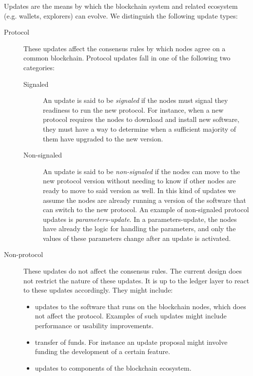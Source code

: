 \documentclass[11pt,a4paper]{article}
\begin{document}
Updates are the means by which the blockchain system and related ecosystem (e.g.
wallets, explorers) can evolve. We distinguish the following update types:
\begin{description}
\item[Protocol] These updates affect the consensus rules by which nodes agree on
  a common blockchain. Protocol updates fall in one of the following two
  categories:
  \begin{description}
  \item[Signaled] An update is said to be \emph{signaled} if the nodes must
    signal they readiness to run the new protocol. For instance, when a new
    protocol requires the nodes to download and install new software, they must
    have a way to determine when a sufficient majority of them have upgraded to
    the new version.
  \item[Non-signaled] An update is said to be \emph{non-signaled} if the nodes
    can move to the new protocol version without needing to know if other nodes
    are ready to move to said version as well. In this kind of updates we assume
    the nodes are already running a version of the software that can switch to
    the new protocol. An example of non-signaled protocol updates is
    \emph{parameters-update}. In a parameters-update, the nodes have already the
    logic for handling the parameters, and only the values of these parameters
    change after an update is activated.
  \end{description}
\item[Non-protocol] These updates do not affect the consensus rules. The current
  design does not restrict the nature of these updates. It is up to the ledger
  layer to react to these updates accordingly. They might include:
  \begin{itemize}
  \item updates to the software that runs on the blockchain nodes, which does
    not affect the protocol. Examples of such updates might include performance
    or usability improvements.
  \item transfer of funds. For instance an update proposal might involve funding
    the development of a certain feature.
  \item updates to components of the blockchain ecosystem.
  \end{itemize}
\end{description}
\end{document}

